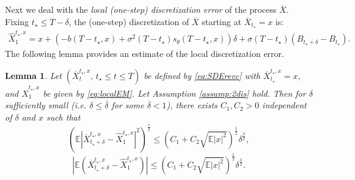 \documentclass[letterpaper,11pt,reqno]{amsart}
\newtheorem{lemma}[theorem]{Lemma}
\numberwithin{equation}{section}
\begin{document}
\quad Next we deal with the {\em local (one-step) discretization error} of the process $\overline{X}$.
Fixing $t_{\star} \le T-\delta$, 
the (one-step) discretization of $\overline{X}$ starting at $\overline{X}_{t_\star} = x$
is:
\begin{equation}
\label{eq:localEM}
\begin{aligned}
\widehat{X}^{t_\star, x}_1 = x + (-b(T-t_\star, x) + 
\sigma^2(T-t_\star) s_\theta(T-t_\star, x)) \delta + \sigma(T - t_\star) (B_{t_\star + \delta} - B_{t_\star}). 
\end{aligned}
\end{equation}
The following lemma provides an estimate of the local discretization error.
\begin{lemma}
\label{lem:localest}
Let $(\overline{X}_t^{t_\star, x}, \, t_\star \le t \le T)$ be defined by \eqref{eq:SDErevc} with $\overline{X}^{t_\star, x}_{t_\star} = x$,
and $\widehat{X}^{t_\star, x}_1$ be given by \eqref{eq:localEM}.
Let Assumption \ref{assump:2dis} hold. 
Then for $\delta$ sufficiently small (i.e. $\delta \le \overline{\delta}$ for some $\overline{\delta} < 1$),
there exists $C_1, C_2 > 0$ independent of $\delta$ and $x$ such that
\begin{equation}
\label{eq:localest1}
\left(\mathbb{E}|\overline{X}^{t_\star, x}_{t_{\star} + \delta} -\widehat{X}^{t_\star, x}_1 |^2 \right)^{\frac{1}{2}}
\le (C_1 + C_2 \sqrt{\mathbb{E}|x|^2} )^{\frac{1}{2}} \delta^{\frac{3}{2}},
\end{equation}
\begin{equation}
\label{eq:localest2}
|\mathbb{E}(\overline{X}^{t_\star, x}_{t_{\star} + \delta} -\widehat{X}^{t_\star, x}_1)|
\le (C_1 + C_2 \sqrt{\mathbb{E}|x|^2} )^{\frac{1}{2}} \delta^{\frac{3}{2}}.
\end{equation}
\end{lemma}
\end{document}
